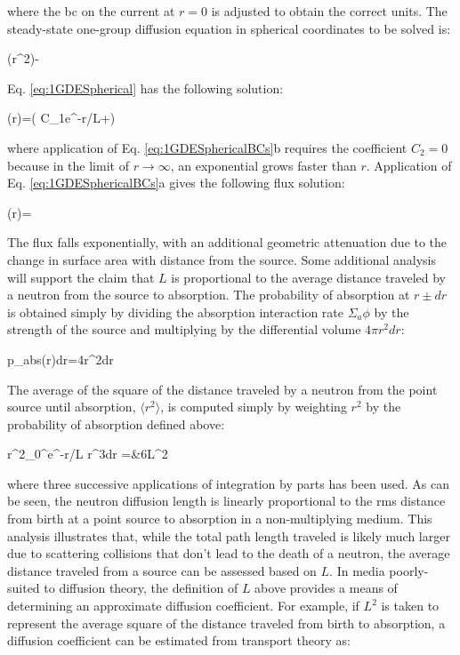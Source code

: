 where the \gls{bc} on the current at \(r=0\) is adjusted to obtain the correct units. The steady-state one-group diffusion equation in spherical coordinates to be solved is:

\beq
\label{eq:1GDESpherical}
\left(r^2\right)-
\eeq

Eq. \eqref{eq:1GDESpherical} has the following solution:

\beq
\phi(r)=\left( C_1e^{-r/L}+\right)
\eeq

where application of Eq. \eqref{eq:1GDESphericalBCs}b requires the coefficient \(C_2=0\) because in the limit of \(r\rightarrow\infty\), an exponential grows faster than \(r\). Application of Eq. \eqref{eq:1GDESphericalBCs}a gives the following flux solution:

\beq
\phi(r)=
\eeq

The flux falls exponentially, with an additional geometric attenuation due to the change in surface area with distance from the source. Some additional analysis will support the claim that \(L\) is proportional to the average distance traveled by a neutron from the source to absorption. The probability of absorption at \(r\pm dr\) is obtained simply by dividing the absorption interaction rate \(\Sigma_a\phi\) by the strength of the source and multiplying by the differential volume \(4\pi r^2dr\):

\beq
p_{abs}(r)dr=4\pi r^2dr
\eeq

The average of the square of the distance traveled by a neutron from the point source until absorption, \(\langle r^2\rangle\), is computed simply by weighting \(r^2\) by the probability of absorption defined above:

\beqa
\langle r^2\rangle\equiv{}\int_{0}^\infty e^{-r/L} r^3dr
=&6L^2
\eeqa

where three successive applications of integration by parts has been used. As can be seen, the neutron diffusion length is linearly proportional to the \gls{rms} distance from birth at a point source to absorption in a non-multiplying medium. This analysis illustrates that, while the total path length traveled is likely much larger due to scattering collisions that don't lead to the death of a neutron, the average distance traveled from a source can be assessed based on \(L\). In media poorly-suited to diffusion theory, the definition of \(L\) above provides a means of determining an approximate diffusion coefficient. For example, if \(L^2\) is taken to represent the average square of the distance traveled from birth to absorption, a diffusion coefficient can be estimated from transport theory as:

